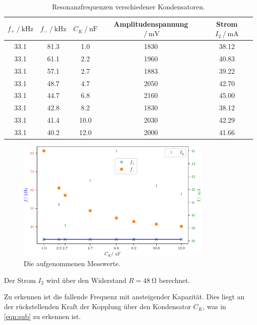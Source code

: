 \begin{table}
    \centering
    \caption{Resonanzfrequenzen verschiedener Kondensatoren.}
    \label{tab:resonanz}
    \begin{tabular}{c c c c c}
        \toprule
        $f_+ \:/\: \si{\kilo\hertz}$ & $f_- \:/\: \si{\kilo\hertz}$ & $C_K \:/\: \si{\nano\farad}$ & Amplitudenspannung $\:/\: \si{\milli\volt}$ & Strom $I_2 \:/\: \si{\milli\ampere}$ \\
        \midrule
        33.1 & 81.3 & 1.0  & 1830  &  38.12  \\
        33.1 & 61.1 & 2.2  & 1960  &  40.83  \\
        33.1 & 57.1 & 2.7  & 1883  &  39.22  \\
        33.1 & 48.7 & 4.7  & 2050  &  42.70  \\
        33.1 & 44.7 & 6.8  & 2160  &  45.00  \\
        33.1 & 42.8 & 8.2  & 1830  &  38.12  \\
        33.1 & 41.4 & 10.0 & 2030  &  42.29  \\
        33.1 & 40.2 & 12.0 & 2000  &  41.66  \\
        \bottomrule
    \end{tabular}
\end{table}

\begin{figure} %
    \centering
    \includegraphics[width=0.85\textwidth]{plots/Messdaten.pdf}
    \caption{Die aufgenommenen Messwerte.}
    \label{fig:messwerte}
\end{figure}

Der Strom $I_2$ wird über den Widerstand $R = \SI{48}{\ohm}$ berechnet.

Zu erkennen ist die fallende Frequenz mit ansteigender Kapazität. Dies liegt an der rückstellenden Kraft der Kopplung über den Kondensator $C_K$, was in \eqref{eqn:sub} zu erkennen ist.


